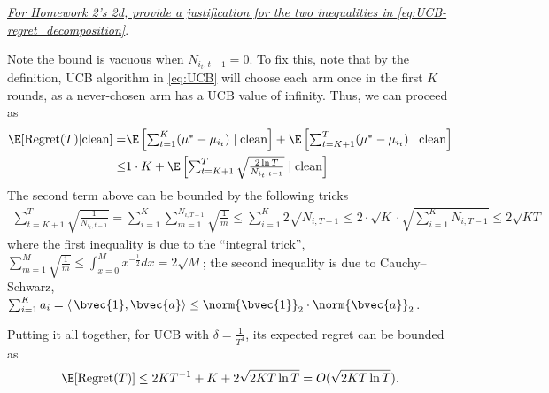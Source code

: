 \underline{\em For Homework 2's 2d, provide a justification for the two inequalities in \eqref{eq:UCB-regret_decomposition}}.

Note the bound is vacuous when $N_{i_t,t-1}=0$. To fix this, note that by the definition, UCB algorithm in \eqref{eq:UCB} will choose each arm once in the first $K$ rounds, as a never-chosen arm has a UCB value of infinity.
Thus, we can proceed as
\begin{align*}
\E[\Regret(T) | {\rm clean}] = &
\E\left[\textstyle\sum_{t=1}^{K} (\mu^*-\mu_{i_t}) \mid {\rm clean}\right] + \E\left[\textstyle\sum_{t=K+1}^{T} (\mu^*-\mu_{i_t}) \mid {\rm clean}\right] \\
\leq& 1\cdot K + \E\left[\textstyle\sum_{t=K+1}^{T} \sqrt{\tfrac{2\ln T}{N_{i_t,t-1}}} \mid {\rm clean}\right]
\end{align*}
The second term above can be bounded by the following tricks
\begin{align*}
\sum_{t=K+1}^{T} \sqrt{\frac{1}{N_{i_t,t-1}}} = \sum_{i=1}^{K}\sum_{m=1}^{N_{i,T-1}}\sqrt{\frac{1}{m}} 
\leq \sum_{i=1}^{K}  2\sqrt{N_{i,T-1}}\leq 2 \cdot \sqrt{K} \cdot \sqrt{\textstyle\sum_{i=1}^K N_{i,T-1}}
\leq 2\sqrt{KT}
\end{align*}
where 
the first inequality is due to the ``integral trick'', $\sum_{m=1}^{M}\sqrt{\frac{1}{m}}\leq\int_{x=0}^M x^{-\frac{1}{2}}dx=2\sqrt{M}$;
the second inequality is due to Cauchy–Schwarz, $\sum_{i=1}^{K}a_i = \langle\,\bvec{1},\bvec{a}\rangle\leq\norm{\bvec{1}}_2\cdot\norm{\bvec{a}}_2$.

Putting it all together, for UCB with $\delta=\frac{1}{T^4}$, its expected regret can be bounded as
\begin{align*}
    \E[\Regret(T)] \leq 2KT^{-1} + K + 2\sqrt{2KT\ln T} = O(\sqrt{2KT\ln T})
    .
\end{align*}